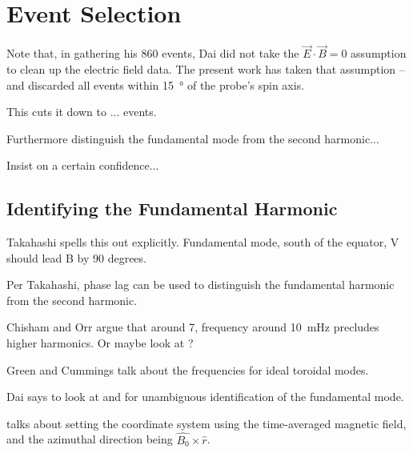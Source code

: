 
\section{Event Selection}




Note that, in gathering his 860 events, Dai\cite{dai_2015} did not take the $\vec{E} \cdot \vec{B} = 0$ assumption to clean up the electric field data. The present work has taken that assumption -- and discarded all events within \SI{15}{\degree} of the probe's spin axis. 

This cuts it down to ... events. 

Furthermore distinguish the fundamental mode from the second harmonic...

Insist on a certain confidence... 



\subsection{Identifying the Fundamental Harmonic}

Takahashi\cite{takahashi_2013} spells this out explicitly. Fundamental mode, south of the equator, V should lead B by 90 degrees. 

Per Takahashi\cite{takahashi_2011}, phase lag can be used to distinguish the fundamental harmonic from the second harmonic. 

Chisham and Orr\cite{chisham_1991} argue that around \SI{7}{\RE}, frequency around \SI{10}{\mHz} precludes higher harmonics. Or maybe look at \cite{green_1985}?

Green\cite{green_1979} and Cummings\cite{cummings_1969} talk about the frequencies for ideal toroidal modes. 

Dai\cite{dai_2015} says to look at \cite{takahashi_2011} and \cite{dai_2013} for unambiguous identification of the fundamental mode. 

\cite{liu_2010} talks about setting the coordinate system using the time-averaged magnetic field, and the azimuthal direction being $\hat{B_0} \times \hat{r}$. 

